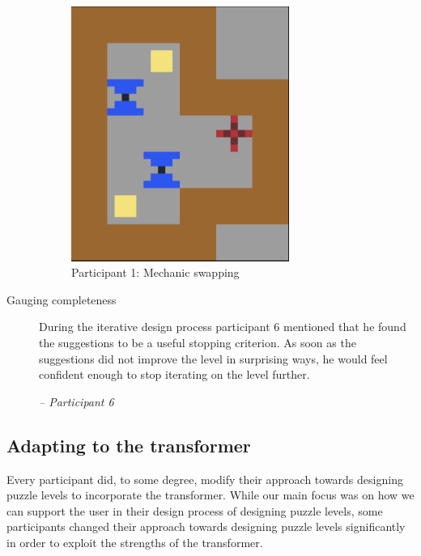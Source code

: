 \begin{description}
\begin{figure}[!htbp]
\begin{minipage}{0.5\textwidth}
\includegraphics[width=0.7\textwidth]{figures/rulebasedimprovingto.png}
\end{minipage}
\caption{Participant 1: Mechanic swapping}
\end{figure}


\item[Gauging completeness] During the iterative design process participant 6 mentioned that he found the suggestions to be a useful stopping criterion. As soon as the suggestions did not improve the level in surprising ways, he would feel confident enough to stop iterating on the level further.

\textit{ -- Participant 6}
\end{description}

\subsection{Adapting to the transformer}
Every participant did, to some degree, modify their approach towards designing puzzle levels to incorporate the transformer. While our main focus was on how we can support the user in their design process of designing puzzle levels, some participants changed their approach towards designing puzzle levels significantly in order to exploit the strengths of the transformer.

